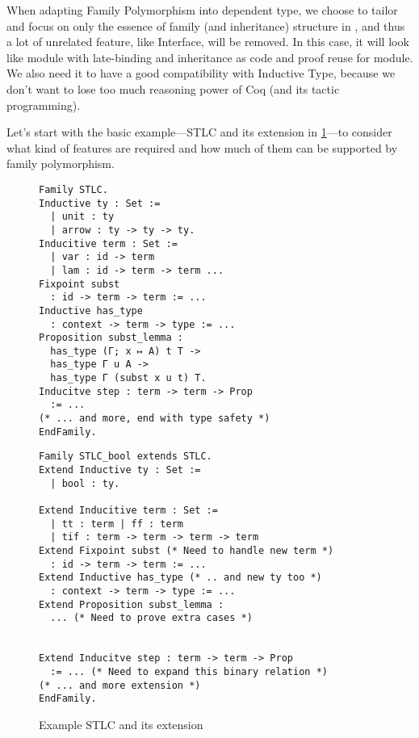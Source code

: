 When adapting Family Polymorphism into dependent type, we choose to tailor and focus on only the essence of family (and inheritance) structure in \citet{zm2017}, and thus a lot of unrelated feature, like Interface, will be removed. In this case, it will look like module with late-binding and inheritance as code and proof reuse for module. We also need it to have a good compatibility with Inductive Type, because we don't want to lose too much reasoning power of Coq (and its tactic programming). 

Let's start with the basic example---STLC and its extension in \cref{fig:STLC-example}---to consider what kind of features are required and how much of them can be supported by family polymorphism.

\begin{figure}[!htb]
  \begin{minipage}[t]{0.47\linewidth}
\begin{verbatim}
Family STLC.
Inductive ty : Set :=
  | unit : ty
  | arrow : ty -> ty -> ty.
Inducitive term : Set := 
  | var : id -> term 
  | lam : id -> term -> term ...
Fixpoint subst 
  : id -> term -> term := ...
Inductive has_type 
  : context -> term -> type := ...
Proposition subst_lemma :
  has_type (Γ; x ↦ A) t T ->
  has_type Γ u A ->
  has_type Γ (subst x u t) T.
Inducitve step : term -> term -> Prop 
  := ...
(* ... and more, end with type safety *)
EndFamily.
\end{verbatim}
  \end{minipage}
  \begin{minipage}[t]{0.47\linewidth}
\begin{verbatim}
Family STLC_bool extends STLC.
Extend Inductive ty : Set :=
  | bool : ty.

Extend Inducitive term : Set := 
  | tt : term | ff : term 
  | tif : term -> term -> term -> term
Extend Fixpoint subst (* Need to handle new term *)
  : id -> term -> term := ...
Extend Inductive has_type (* .. and new ty too *)
  : context -> term -> type := ...
Extend Proposition subst_lemma :
  ... (* Need to prove extra cases *)


Extend Inducitve step : term -> term -> Prop 
  := ... (* Need to expand this binary relation *)
(* ... and more extension *)
EndFamily.
\end{verbatim}
  \end{minipage}
  \caption{Example STLC and its extension}\label{fig:STLC-example}
\end{figure}


